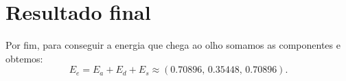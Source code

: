 \documentclass[12pt,a4paper]{article}
\begin{document}
\section{Resultado final}

Por fim, para conseguir a energia que chega ao olho somamos as componentes e obtemos:
\[
  \boxed{E_e=E_a+E_d+E_s\approx(0.70896,\,0.35448,\,0.70896)}.
\]

\medskip
\noindent
\end{document}
